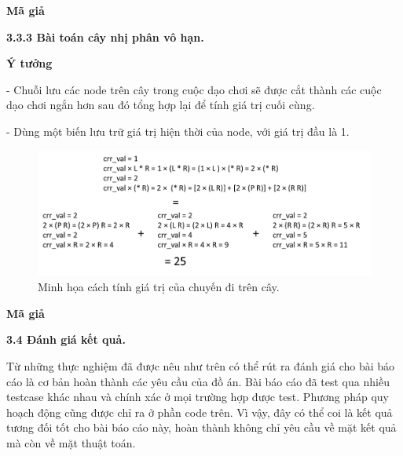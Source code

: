 

\setlength{\parindent}{0cm}
\textbf{Mã giả}


\smallskip
{}




\setlength{\parindent}{0.5cm}

\bigskip
\changefontsizes{14pt}
\textbf{3.3.3 Bài toán cây nhị phân vô hạn.}



\smallskip
{}
\changefontsizes{13pt}
\textbf{Ý tưởng}


\setlength{\parindent}{0cm}


- Chuỗi lưu các node trên cây trong cuộc dạo chơi sẽ được cắt thành các cuộc dạo chơi ngắn hơn sau đó tổng hợp lại để tính giá trị cuối cùng.

- Dùng một biến lưu trữ giá trị hiện thời của node, với giá trị đầu là 1.


\vspace{-0.5cm}
\begin{figure}[h!]
	\includegraphics[scale=0.3]{./image/tree.png}
	\caption{Minh họa cách tính giá trị của chuyến đi trên cây.}
\end{figure}



\setlength{\parindent}{0cm}
\textbf{Mã giả}








\bigskip
\changefontsizes{14pt}

\setlength{\parindent}{0.0cm}
\textbf{3.4 Đánh giá kết quả.}
\setlength{\parindent}{1.0cm}

\smallskip
\changefontsizes{13pt}

Từ những thực nghiệm đã được nêu như trên có thể rút ra đánh giá cho bài báo cáo là cơ bản hoàn thành các yêu cầu của đồ án. Bài báo cáo đã test qua nhiều testcase khác nhau và chính xác ở mọi trường hợp được test. Phương pháp quy hoạch động cũng được chỉ ra ở phần code trên. Vì vậy, đây có thể coi là kết quả tương đối tốt cho bài báo cáo này, hoàn thành không chỉ yêu cầu về mặt kết quả mà còn về mặt thuật toán.
%


